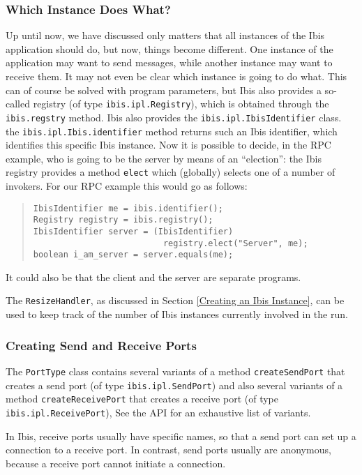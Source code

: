 \documentclass[10pt]{article}
\newcommand{\mysubsubsection}[1]{\subsubsection{#1}\label{#1}}
\begin{document}
\mysubsubsection{Which Instance Does What?}

Up until now, we have discussed only matters that all instances of
the Ibis application should do, but now, things become different.
One instance of the application may want to send messages, while
another instance may want to receive them.
It may not even be clear which instance is going to do what.
This can of course be solved with program parameters, but Ibis
also provides a so-called registry (of type
\verb+ibis.ipl.Registry+), which is obtained through the
\verb+ibis.regstry+ method.
Ibis also provides the \verb+ibis.ipl.IbisIdentifier+ class.
the \verb+ibis.ipl.Ibis.identifier+ method returns such an
Ibis identifier, which identifies this specific Ibis instance.
Now it is possible to decide, in the RPC example, who is going
to be the server by means of an ``election'': the Ibis registry
provides a method \verb+elect+ which (globally) selects one of
a number of invokers.
For our RPC example this would go as follows:

\begin{quote}
\begin{verbatim}
IbisIdentifier me = ibis.identifier();
Registry registry = ibis.registry();
IbisIdentifier server = (IbisIdentifier)
                          registry.elect("Server", me);
boolean i_am_server = server.equals(me);
\end{verbatim}
\end{quote}

It could also be that the client and the server are separate programs.

The \verb+ResizeHandler+, as discussed in Section
\ref{Creating an Ibis Instance}, can be used to keep track of the number
of Ibis instances currently involved in the run.

\subsubsection{Creating Send and Receive Ports}

The \verb+PortType+ class contains several variants of a method
\verb+createSendPort+ that creates a send port (of type
\verb+ibis.ipl.SendPort+) and
also several variants of a method \verb+createReceivePort+ that
creates a receive port (of type \verb+ibis.ipl.ReceivePort+),
See the API for an exhaustive list of variants.

In Ibis, receive ports usually have specific names, so that
a send port can set up a connection to a receive port. In contrast,
send ports usually are anonymous, because a receive port cannot
initiate a connection.
\end{document}

